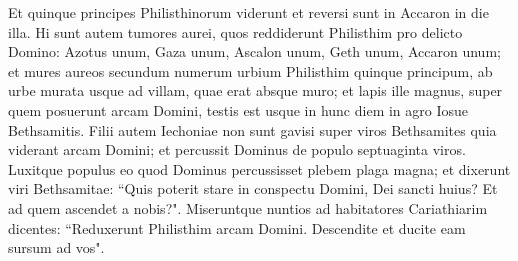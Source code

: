 \begin{biblechapter}
\verse Et quinque principes Philisthinorum viderunt et reversi sunt in Accaron in die illa. 
\verse Hi sunt autem tumores aurei, quos reddiderunt Philisthim pro delicto Domino: Azotus unum, Gaza unum, Ascalon unum, Geth unum, Accaron unum; 
\verse et mures aureos secundum numerum urbium Philisthim quinque principum, ab urbe murata usque ad villam, quae erat absque muro; et lapis ille magnus, super quem posuerunt arcam Domini, testis est usque in hunc diem in agro Iosue Bethsamitis. 
\verse Filii autem Iechoniae non sunt gavisi super viros Bethsamites quia viderant arcam Domini; et percussit Dominus de populo septuaginta viros. Luxitque populus eo quod Dominus percussisset plebem plaga magna; 
\verse et dixerunt viri Bethsamitae: “Quis poterit stare in conspectu Domini, Dei sancti huius? Et ad quem ascendet a nobis?". 
\verse Miseruntque nuntios ad habitatores Cariathiarim dicentes: “Reduxerunt Philisthim arcam Domini. Descendite et ducite eam sursum ad vos". 
\end{biblechapter}

